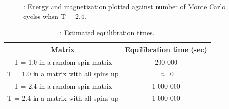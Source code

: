 \documentclass{article}
\begin{document}
{\begin{figure}[H]
\caption{: Energy and magnetization plotted against number of Monte Carlo cycles when T = 2.4. }
\label{fig:steady_E_highT}
\end{figure}

{\renewcommand{\arraystretch}{1.5}
\begin{table}[H]
  \caption{: Estimated equilibration times.}
    \label{Tab:equilibration_times}
    \centering
  \begin{tabular}{c c}
      Matrix & Equilibration time (sec)\\
      \hline
      T = 1.0 in a random spin matrix & 200 000  \\
      T = 1.0 in a matrix with all spins up & $\approx$ 0 \\
      T = 2.4 in a random spin matrix & 1 000 000\\
      T = 2.4 in a matrix with all spins up & 1 000 000\\
    \hline
  \end{tabular}
\end{table}

}}
\end{document}
